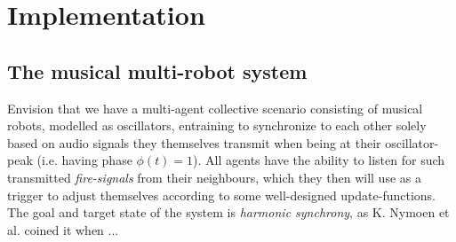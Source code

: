 \chapter{Implementation}






\section{The musical multi-robot system}
Envision that we have a multi-agent collective scenario consisting of musical robots, modelled as oscillators, entraining to synchronize to each other solely based on audio signals they themselves transmit when being at their oscillator-peak (i.e. having phase $\phi(t)=1$). All agents have the ability to listen for such transmitted \textit{fire-signals} from their neighbours, which they then will use as a trigger to adjust themselves according to some well-designed update-functions. The goal and target state of the system is \textit{harmonic synchrony}, as K. Nymoen et al. \cite{nymoen_synch} coined it when ...

